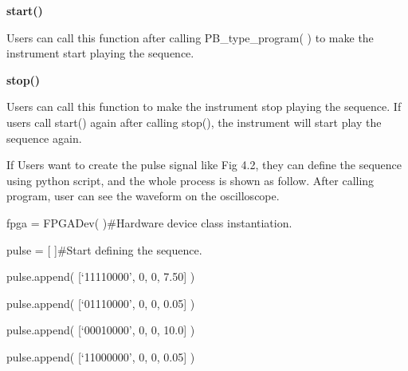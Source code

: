 \noindent\fontsize{12pt}{\baselineskip}\textbf{start()}

Users can call this function after calling PB\_type\_program( ) to make the instrument start playing the sequence.
\vspace{0.4cm}

\noindent\fontsize{12pt}{\baselineskip}\textbf{stop()}

Users can call this function to make the instrument stop playing the sequence. If users call start() again after calling stop(), the instrument will start play the sequence again.
\vspace{0.4cm}

\noindent\fontsize{12pt}{\baselineskip}\textbf{}

If Users want to create the pulse signal like Fig 4.2, they can define the sequence using python script, and the whole process is shown as follow. After calling program, user can see the waveform on the oscilloscope.

fpga = FPGADev( )\qquad          \#Hardware device class instantiation.

pulse = [{ }{ }]\qquad            \#Start defining the sequence.

%
%
%
%
%
%
%
%
%

pulse.append({ }[`11110000', { }0, { }0, { }7.50]{ })

pulse.append({ }[`01110000', { }0, { }0, { }0.05]{ })

pulse.append({ }[`00010000', { }0, { }0, { }10.0]{ })

pulse.append({ }[`11000000', { }0, { }0, { }0.05]{ })

